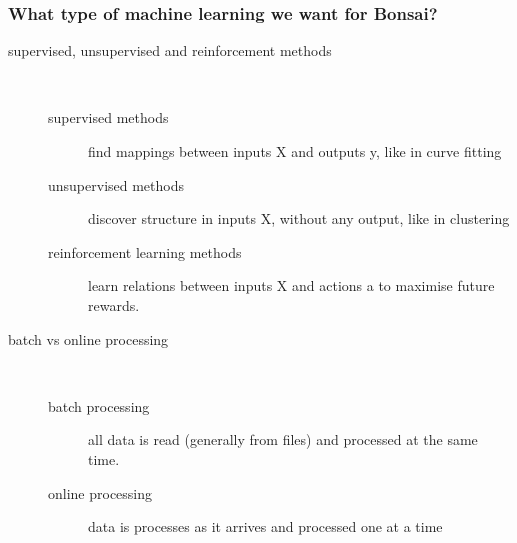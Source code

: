 \begin{frame}
    \frametitle{What type of machine learning we want for Bonsai?}

    \begin{description}

        \item[supervised, unsupervised and reinforcement methods]\mbox{}\\

            \begin{description}

                \item[supervised methods] find mappings between inputs X and outputs y, like in curve fitting

                \item[unsupervised methods] discover structure in inputs X, without any output, like in clustering

                \item[reinforcement learning methods] learn relations between inputs X and actions a to maximise future rewards.

            \end{description}

        \item[batch vs online processing]\mbox{}\\

            \begin{description}

                \item[batch processing] all data is read (generally from files)
                    and processed at the same time.

                \item[online processing] data is processes as it arrives and
                    processed one at a time

            \end{description}

    \end{description}

\end{frame}

